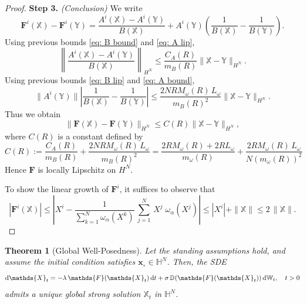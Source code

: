 \documentclass[12pt]{amsart}
\newcommand{\D}[1]{\mbox{\rm #1}}
\newcommand{\dd}{\D{d}}
\numberwithin{equation}{section}
\newtheorem{theorem}{Theorem}[section]
\begin{document}
\begin{proof}
\textbf{Step 3.} \textit{(Conclusion)} 
We write
\begin{equation*}
    \mathbf{F}^i(\mathds{X}) - \mathbf{F}^i(\mathds{Y}) = \frac{A^i(\mathds{X}) - A^i(\mathds{Y})}{B(\mathds{X})} + A^i(\mathds{Y}) \left( \frac{1}{B(\mathds{X})} - \frac{1}{B(\mathds{Y})} \right).
\end{equation*}
\textbullet\; Using previous bounds \eqref{eq: B bound} and \eqref{eq: A lip},
\begin{equation*}
    \left\|\frac{A^i(\mathds{X}) - A^i(\mathds{Y})}{B(\mathds{X})}\right\|_{H^N} \le \frac{C_A(R)}{m_B(R)} \|\mathds{X} - \mathds{Y}\|_{H^N}.
\end{equation*}
\textbullet\; Using previous bounds \eqref{eq: B lip} and \eqref{eq: A bound},
\begin{equation*}
    \|A^i(\mathds{Y})\| \left|\frac{1}{B(\mathds{X})} - \frac{1}{B(\mathds{Y})}\right| \le \frac{2N R M_\omega(R)\, L_\omega}{m_B(R)^2} \|\mathds{X} - \mathds{Y}\|_{H^N}.
\end{equation*}
Thus we obtain
\begin{equation*}
    \|\mathbf{F}(\mathds{X}) - \mathbf{F}(\mathds{Y})\|_{H^N} \le C(R)\|\mathds{X} - \mathds{Y}\|_{H^N},
\end{equation*}
where $C(R)$ is a constant defined by
\begin{equation*}
    C(R) := \frac{C_A(R)}{m_B(R)} + \frac{2N R M_\omega(R)\, L_\omega}{m_B(R)^2} =  \frac{2R M_\omega(R) + 2R L_\omega}{m_\omega(R)} + \frac{2 R M_\omega(R)\, L_\omega}{N(m_\omega(R))^2}
\end{equation*}
Hence $\mathbf{F}$ is locally Lipschitz on $H^N$.

To show the linear growth of $\mathbf{F}^{i}$, it suffices to observe that
\begin{equation*}
    |\mathbf{F}^{i}(\mathds{X})| \leq \left|  X^{i} - \frac{1}{\sum\limits_{k=1}^{N}\omega_{\alpha}(X^{k})} \, \sum\limits_{j=1}^{N}\,X^{j}\; \omega_{\alpha}(X^{j})  \right| \leq |X^{i}| + \|\mathds{X}\|\leq 2\,\|\mathds{X}\|.
\end{equation*}
\end{proof}



\begin{theorem}[Global Well-Posedness]\label{thm: global well-posedness}
Let the standing assumptions hold, and assume the initial condition satisfies $\mathbf{x}_{\circ} \in \mathbb{H}^{N}$. Then, the SDE
\begin{equation}\label{eq: CBO main compact}
    \dd \mathds{X}_{t} = -\lambda \, \mathds{F}(\mathds{X}_{t}) \, \dd t + \sigma\, \mathbb{D}(\mathds{F}(\mathds{X}_{t})) \, \dd \mathbb{W}_{t},\quad t>0
\end{equation}
admits a unique global strong solution $\mathds{X}_{t}$ in $\mathbb{H}^{N}$.
\end{theorem}
\end{document}
